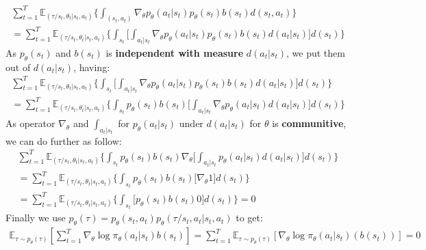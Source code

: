 \documentclass[12pt]{article}
\begin{document}
\begin{enumerate} [label=(\alph*)]
\begin{multline}
   \sum_{t=1}^T \mathbb{E}_{(\tau / s_t, \theta_t| s_t, a_t)} \lbrace \int_{(s_t,a_t)} \nabla_\theta p_{\theta} (a_t|s_t) p_{\theta}(s_t) b(s_t) d(s_t, a_t)\rbrace \\
   = \sum_{t=1}^T \mathbb{E}_{(\tau / s_t, \theta_t| s_t, a_t)} \lbrace \int_{s_t} \lbrack \int_{a_t|s_t} \nabla_{\theta} p_{\theta}(a_t|s_t) p_{\theta}(s_t) b(s_t) d(a_t|s_t)\rbrack d(s_t)\rbrace
\end{multline}
As $p_{\theta}(s_t)$ and $b(s_t)$ is \textbf{independent with measure} $d(a_t|s_t)$, we put them out of $d(a_t|s_t)$, having:
\begin{multline}
   \sum_{t=1}^T \mathbb{E}_{(\tau / s_t, \theta_t| s_t, a_t)} \lbrace \int_{s_t} \lbrack \int_{a_t|s_t} \nabla_{\theta} p_{\theta}(a_t|s_t) p_{\theta}(s_t) b(s_t) d(a_t|s_t)\rbrack d(s_t)\rbrace \\
   = \sum_{t=1}^T \mathbb{E}_{(\tau / s_t, \theta_t| s_t, a_t)} \lbrace \int_{s_t} p_{\theta}(s_t) b(s_t) \lbrack \int_{a_t|s_t} \nabla_{\theta} p_{\theta}(a_t|s_t) d(a_t|s_t)\rbrack d(s_t)\rbrace
\end{multline}
As operator $\nabla_\theta$ and $\int_{a_t|s_t}$ for $p_\theta(a_t|s_t)$ under $d(a_t|s_t)$ for $\theta$ is \textbf{communitive}, we can do further as follow:
\begin{multline}
 \sum_{t=1}^T \mathbb{E}_{(\tau / s_t, \theta_t| s_t, a_t)} \lbrace \int_{s_t} p_{\theta}(s_t) b(s_t)  \nabla_{\theta} \lbrack \int_{a_t|s_t} p_{\theta}(a_t|s_t) d(a_t|s_t)\rbrack d(s_t)\rbrace \\
 =  \sum_{t=1}^T \mathbb{E}_{(\tau / s_t, \theta_t| s_t, a_t)} \lbrace \int_{s_t} p_{\theta}(s_t) b(s_t) \lbrack \nabla_{\theta}  1 \rbrack d(s_t)\rbrace \\
 =  \sum_{t=1}^T \mathbb{E}_{(\tau / s_t, \theta_t| s_t, a_t)} \lbrace \int_{s_t} \lbrack p_{\theta}(s_t) b(s_t) 0 \rbrack d(s_t)\rbrace = 0
\end{multline}
Finally we use $p_\theta(\tau) = p_\theta(s_t, a_t)p_\theta(\tau / s_t, a_t | s_t, a_t)$ to get:
\begin{multline}
  \mathbb{E}_{\tau \sim p_\theta(\tau)} \left[\sum_{t=1}^T \nabla_\theta \log \pi_\theta(a_t|s_t) b(s_t)\right] = \sum_{t=1}^T \mathbb{E}_{\tau \sim p_\theta(\tau)}\left[ \nabla_\theta \log \pi_\theta(a_t|s_t) \left(b(s_t)\right)\right] = 0
\end{multline}


\end{enumerate}
\end{document}
